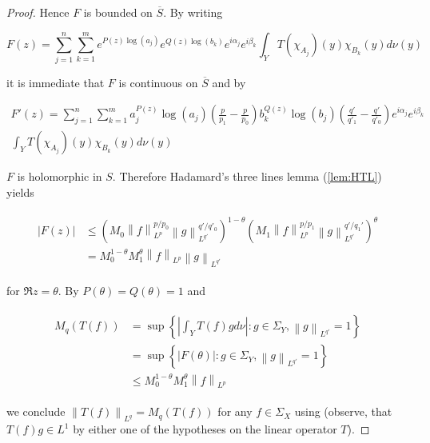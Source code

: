 \begin{proof}
	Hence $F$ is bounded on $\overline{S}$. By writing
	
\begin{equation*}
	F(z) = \sum_{j = 1}^n\sum_{k = 1}^m e^{P(z)\log\left( a_j \right)} e^{Q(z)\log\left( b_k \right)} e^{i\alpha_j} e^{i\beta_k} \int_YT(\chi_{A_j})(y)\chi_{B_k}(y)d\nu(y) 		
\end{equation*}
	
it is immediate that $F$ is continuous on $\overline{S}$ and by 

\begin{multline*}
	F'(z) = \sum_{j = 1}^n\sum_{k = 1}^m a^{P(z)}_j\log \left( a_j \right) \left( \frac{p}{p_1} - \frac{p}{p_0} \right) b_k^{Q(z)}\log\left( b_j \right)\left( \frac{q'}{q'_1} - \frac{q'}{q'_0} \right) e^{i\alpha_j} e^{i\beta_k} \\\int_YT(\chi_{A_j})(y)\chi_{B_k}(y)d\nu(y) 	
\end{multline*}

$F$ is holomorphic in $S$. Therefore Hadamard's three lines lemma (\ref{lem:HTL}) yields

\begin{gather}
	\begin{aligned}
		\left| F(z) \right| &\leqslant \left( M_0  \left\|f\right\|_{L^p}^{p/p_0} \left\|g\right\|_{L^{q'}}^{q'/q'_0} \right)^{1 - \theta}\left(  M_1 \left\|f\right\|_{L^p}^{p/p_1}\left\|g\right\|_{L^{q'}}^{q'/q_1'} \right)^\theta\\
			&= M_0^{1 - \theta}M_1^\theta \left\|f\right\|_{L^p}\left\|g\right\|_{L^{q'}}
		\label{est:F}
	\end{aligned}
\end{gather}

	for $\Re z = \theta$. By $P(\theta) = Q(\theta) = 1$ and

\begin{gather}
	\begin{aligned}
		M_q\left( T(f) \right) &= \sup\left\{\left| \int_Y T(f)gd\nu\right| : g \in \Sigma_Y, \left\|g\right\|_{L^{q'}} = 1\right\}\\
		&=  \sup\left\{\left| F(\theta)\right| : g \in \Sigma_Y, \left\|g\right\|_{L^{q'}} = 1\right\}\\
		&\leqslant M_0^{1 - \theta}M_1^\theta \left\|f\right\|_{L^p}
		\label{id:F}
	\end{aligned}
\end{gather}

	we conclude $\left\| T(f)\right\|_{L^q} = M_q\left( T(f) \right)$ for any $f \in \Sigma_X$ using \cite[189]{folland:real_analysis:1999} (observe, that $T(f)g \in L^1$ by either one of the hypotheses on the linear operator $T$).
\end{proof}

